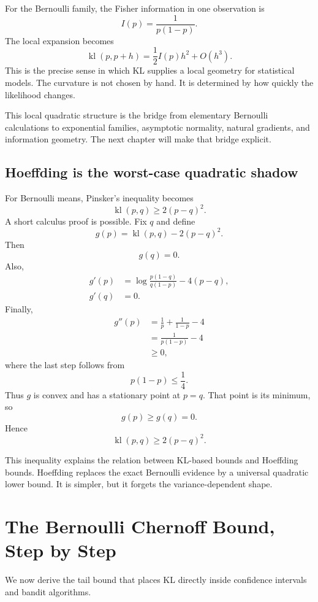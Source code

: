 \documentclass[en,nofont,11pt]{elegantbook}
\newcommand{\kl}{\operatorname{kl}}
\begin{document}
For the Bernoulli family, the Fisher information in one observation is
\[
I(p)=\frac{1}{p(1-p)}.
\]
The local expansion becomes
\[
\kl(p,p+h)
=
\frac12 I(p)h^2+O(h^3).
\]
This is the precise sense in which KL supplies a local geometry for statistical models. The curvature is not chosen by hand. It is determined by how quickly the likelihood changes.

\begin{researchbox}
This local quadratic structure is the bridge from elementary Bernoulli calculations to exponential families, asymptotic normality, natural gradients, and information geometry. The next chapter will make that bridge explicit.
\end{researchbox}

\section{Hoeffding is the worst-case quadratic shadow}

For Bernoulli means, Pinsker's inequality becomes
\[
\kl(p,q)\ge2(p-q)^2.
\]
A short calculus proof is possible. Fix $q$ and define
\[
g(p)=\kl(p,q)-2(p-q)^2.
\]
Then
\[
g(q)=0.
\]
Also,
\begin{align*}
g'(p)
&=
\log\frac{p(1-q)}{q(1-p)}-4(p-q),\\
g'(q)
&=0.
\end{align*}
Finally,
\begin{align*}
g''(p)
&=
\frac1p+\frac1{1-p}-4\\
&=
\frac{1}{p(1-p)}-4\\
&\ge0,
\end{align*}
where the last step follows from
\[
p(1-p)\le\frac14.
\]
Thus $g$ is convex and has a stationary point at $p=q$. That point is its minimum, so
\[
g(p)\ge g(q)=0.
\]
Hence
\[
\boxed{\kl(p,q)\ge2(p-q)^2.}
\]

This inequality explains the relation between KL-based bounds and Hoeffding bounds. Hoeffding replaces the exact Bernoulli evidence by a universal quadratic lower bound. It is simpler, but it forgets the variance-dependent shape.

\chapter{The Bernoulli Chernoff Bound, Step by Step}

We now derive the tail bound that places KL directly inside confidence intervals and bandit algorithms.
\end{document}
